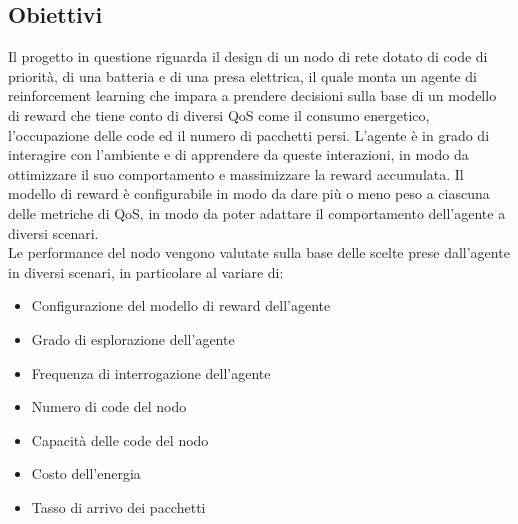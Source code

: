 \documentclass[conference]{IEEEtran}
\begin{document}
\subsection{Obiettivi}
Il progetto in questione riguarda il design di un nodo di rete dotato di code di priorità, di una batteria e di una presa elettrica, il quale monta un agente di reinforcement learning che impara a prendere decisioni sulla base di un modello di reward che tiene conto di diversi QoS come il consumo energetico, l'occupazione delle code ed il numero di pacchetti persi. L'agente è in grado di interagire con l'ambiente e di apprendere da queste interazioni, in modo da ottimizzare il suo comportamento e massimizzare la reward accumulata. Il modello di reward è configurabile in modo da dare più o meno peso a ciascuna delle metriche di QoS, in modo da poter adattare il comportamento dell'agente a diversi scenari.
\\Le performance del nodo vengono valutate sulla base delle scelte prese dall'agente in diversi scenari, in particolare al variare di:
\begin{itemize}
    \item Configurazione del modello di reward dell'agente
    \item Grado di esplorazione dell'agente
    \item Frequenza di interrogazione dell'agente
    \item Numero di code del nodo
    \item Capacità delle code del nodo
    \item Costo dell'energia
    \item Tasso di arrivo dei pacchetti
\end{itemize}
\end{document}
